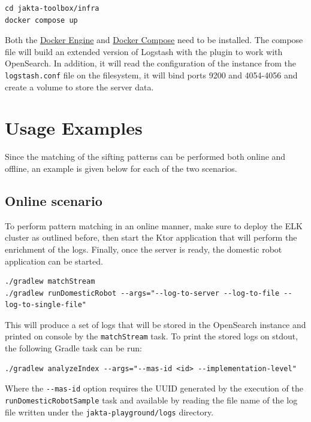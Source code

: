 \documentclass{scrartcl}
\begin{document}
\begin{verbatim}
cd jakta-toolbox/infra
docker compose up
\end{verbatim}

Both the \href{https://docs.docker.com/engine/install/}{Docker Engine} and \href{https://docs.docker.com/compose/install/}{Docker Compose} need to be installed.
%
The compose file will build an extended version of Logstash with the plugin to work with OpenSearch. 
%
In addition, it will read the configuration of the instance from the \verb|logstash.conf| file on the filesystem, it will bind ports 9200 and 4054-4056 and create a volume to store the server data.

\section{Usage Examples}

Since the matching of the sifting patterns can be performed both online and offline, an example is given below for each of the two scenarios.

\subsection{Online scenario}

To perform pattern matching in an online manner, make sure to deploy the ELK cluster as outlined before, then start the Ktor application that will perform the enrichment of the logs.
%
Finally, once the server is ready, the domestic robot application can be started.

\begin{verbatim}
./gradlew matchStream
./gradlew runDomesticRobot --args="--log-to-server --log-to-file --log-to-single-file"
\end{verbatim}

This will produce a set of logs that will be stored in the OpenSearch instance and printed on console by the \verb|matchStream| task.
%
To print the stored logs on stdout, the following Gradle task can be run:

\begin{verbatim}
./gradlew analyzeIndex --args="--mas-id <id> --implementation-level"
\end{verbatim}

Where the \verb|--mas-id| option requires the UUID generated by the execution of the \verb|runDomesticRobotSample| task and available by reading the file name of the log file written under the \verb|jakta-playground/logs| directory.
\end{document}
